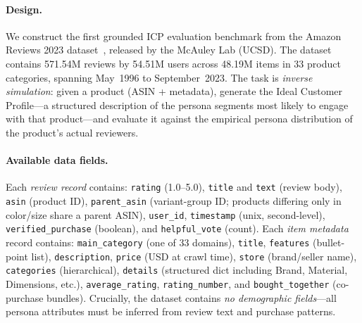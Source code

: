 \paragraph{Design.}
We construct the first grounded ICP evaluation benchmark from the Amazon Reviews 2023 dataset~\cite{hou2024bridging}, released by the McAuley Lab (UCSD).
The dataset contains 571.54M reviews by 54.51M users across 48.19M items in 33 product categories, spanning May~1996 to September~2023.
The task is \emph{inverse simulation}: given a product (ASIN + metadata), generate the Ideal Customer Profile---a structured description of the persona segments most likely to engage with that product---and evaluate it against the empirical persona distribution of the product's actual reviewers.

\paragraph{Available data fields.}
Each \emph{review record} contains: \texttt{rating} (1.0--5.0), \texttt{title} and \texttt{text} (review body), \texttt{asin} (product ID), \texttt{parent\_asin} (variant-group ID; products differing only in color/size share a parent ASIN), \texttt{user\_id}, \texttt{timestamp} (unix, second-level), \texttt{verified\_purchase} (boolean), and \texttt{helpful\_vote} (count).
Each \emph{item metadata} record contains: \texttt{main\_category} (one of 33 domains), \texttt{title}, \texttt{features} (bullet-point list), \texttt{description}, \texttt{price} (USD at crawl time), \texttt{store} (brand/seller name), \texttt{categories} (hierarchical), \texttt{details} (structured dict including Brand, Material, Dimensions, etc.), \texttt{average\_rating}, \texttt{rating\_number}, and \texttt{bought\_together} (co-purchase bundles).
Crucially, the dataset contains \emph{no demographic fields}---all persona attributes must be inferred from review text and purchase patterns.

